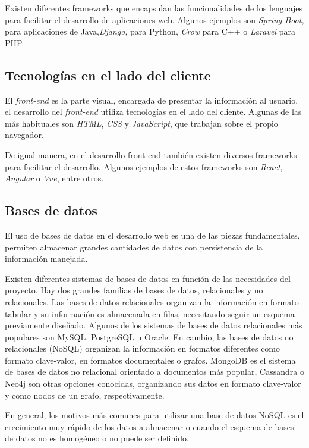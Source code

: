 \documentclass[a4paper, 12pt, oneside]{book}
\begin{document}
Existen diferentes frameworks que encapsulan las funcionalidades de los lenguajes para facilitar el desarrollo de aplicaciones web. Algunos ejemplos son \textit{Spring Boot}, para aplicaciones de Java,\textit{Django}, para Python, \textit{Crow} para C++ o \textit{Laravel} para PHP.

\subsection{Tecnologías en el lado del cliente}
\label{subsec:tecnlogías en el lado del cliente}
El \textit{front-end} es la parte visual, encargada de presentar la información al usuario, el desarrollo del \textit{front-end} utiliza tecnologías en el lado del cliente. Algunas de las más habituales son \textit{HTML}, \textit{CSS} y \textit{JavaScript}, que trabajan sobre el propio navegador.

De igual manera, en el desarrollo front-end también existen diversos frameworks para facilitar el desarrollo. Algunos ejemplos de estos frameworks son \textit{React}, \textit{Angular} o \textit{Vue}, entre otros.

\subsection{Bases de datos}
\label{subsec: bases de datos}
El uso de bases de datos en el desarrollo web es una de las piezas fundamentales, permiten almacenar grandes cantidades de datos con persistencia de la información manejada.

Existen diferentes sistemas de bases de datos en función de las necesidades del proyecto. Hay dos grandes familias de bases de datos, relacionales y no relacionales. Las bases de datos relacionales organizan la información en formato tabular y su información es almacenada en filas, necesitando seguir un esquema previamente diseñado. Algunos de los sistemas de bases de datos relacionales más populares son MySQL, PostgreSQL u Oracle. En cambio, las bases de datos no relacionales (NoSQL) organizan la información en formatos diferentes como formato clave-valor, en formatos documentales o grafos. MongoDB es el sistema de bases de datos no relacional orientado a documentos más popular, Cassandra o Neo4j son otras opciones conocidas, organizando sus datos en formato clave-valor y como nodos de un grafo, respectivamente.

En general, los motivos más comunes para utilizar una base de datos NoSQL es el crecimiento muy rápido de los datos a almacenar o cuando el esquema de bases de datos no es homogéneo o no puede ser definido.
\end{document}
